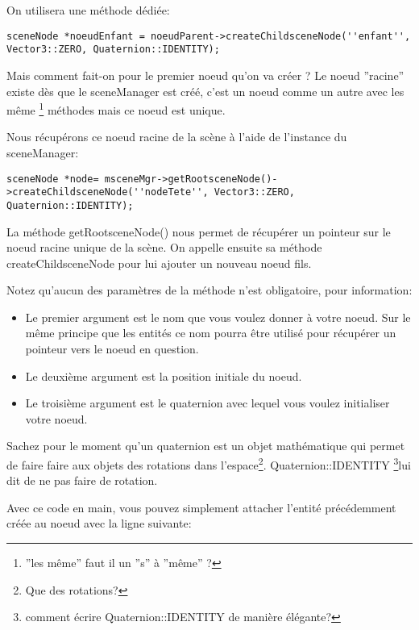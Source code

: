 \documentclass[10pt,a4paper]{report}
\begin{document}
On utilisera une m\'ethode d\'edi\'ee:

\begin{lstlisting}
sceneNode *noeudEnfant = noeudParent->createChildsceneNode(''enfant'', Vector3::ZERO, Quaternion::IDENTITY);
\end{lstlisting}


Mais comment fait-on pour le premier noeud qu'on va cr\'eer ? Le noeud ''racine'' existe d\`es que le sceneManager est cr\'e\'e, c'est un noeud comme un autre avec les m\^eme \footnote{''les m\^eme'' faut il un ''s'' \`{a} ''m\^eme'' ?} m\'ethodes mais ce noeud est unique.\newline

Nous r\'ecup\'erons ce noeud racine de la sc\`ene  \`{a} l'aide de l'instance du sceneManager:
\begin{lstlisting}
sceneNode *node= msceneMgr->getRootsceneNode()->createChildsceneNode(''nodeTete'', Vector3::ZERO, Quaternion::IDENTITY);
\end{lstlisting}

La m\'ethode getRootsceneNode() nous permet de r\'ecup\'erer un pointeur sur le noeud racine unique de la sc\`ene. On appelle ensuite sa m\'ethode createChildsceneNode pour lui ajouter un nouveau noeud fils.

Notez qu'aucun des param\`etres de la m\'ethode n'est obligatoire, pour information:
\begin{itemize}
\item Le premier argument est le nom que vous voulez donner \`{a} votre noeud. Sur le m\^eme principe que les entit\'es ce nom pourra \^etre utilis\'e pour r\'ecup\'erer un pointeur vers le noeud en question. 
\item Le deuxi\`eme argument est la position initiale du noeud.
\item Le troisi\`eme argument est le quaternion avec lequel vous voulez initialiser votre noeud.
\end{itemize}
	

Sachez pour le moment qu'un quaternion est un objet math\'ematique qui permet de faire faire aux objets des rotations dans l'espace\footnote{Que des rotations?}. Quaternion::IDENTITY \footnote{comment \'ecrire Quaternion::IDENTITY de manière \'el\'egante?}lui dit de ne pas faire de rotation.\newline

Avec ce code en main, vous pouvez simplement attacher l'entit\'e pr\'ec\'edemment cr\'e\'ee au noeud avec la ligne suivante:
\end{document}
